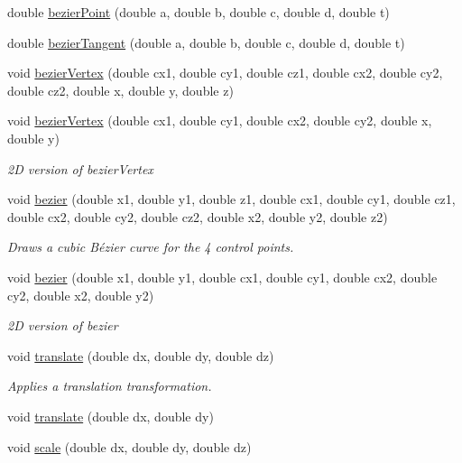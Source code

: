 \begin{DoxyCompactItemize}
\item 
double \hyperlink{namespacecprocessing_aaa32b0ef424d3452942ee2b0c9700a07}{bezier\-Point} (double a, double b, double c, double d, double t)
\item 
double \hyperlink{namespacecprocessing_abbb2d5344f97242bed221f93567c3bd9}{bezier\-Tangent} (double a, double b, double c, double d, double t)
\item 
void \hyperlink{namespacecprocessing_abefd6e82adec560aeb65511d5c04ec62}{bezier\-Vertex} (double cx1, double cy1, double cz1, double cx2, double cy2, double cz2, double x, double y, double z)
\item 
void \hyperlink{namespacecprocessing_a36c29d340db4d37f305d06d8408ef22d}{bezier\-Vertex} (double cx1, double cy1, double cx2, double cy2, double x, double y)
\begin{DoxyCompactList}\small\item\em 2\-D version of bezier\-Vertex \end{DoxyCompactList}\item 
void \hyperlink{namespacecprocessing_ab3bb61d1bd0741647c5f43163844e6a3}{bezier} (double x1, double y1, double z1, double cx1, double cy1, double cz1, double cx2, double cy2, double cz2, double x2, double y2, double z2)
\begin{DoxyCompactList}\small\item\em \-Draws a cubic \-Bézier curve for the 4 control points. \end{DoxyCompactList}\item 
void \hyperlink{namespacecprocessing_a5ec53e4626a728b9525286cd281b4796}{bezier} (double x1, double y1, double cx1, double cy1, double cx2, double cy2, double x2, double y2)
\begin{DoxyCompactList}\small\item\em 2\-D version of bezier \end{DoxyCompactList}\item 
void \hyperlink{namespacecprocessing_a0e437a343ef6fb18eb0212c24ddbf7b2}{translate} (double dx, double dy, double dz)
\begin{DoxyCompactList}\small\item\em \-Applies a translation transformation. \end{DoxyCompactList}\item 
void \hyperlink{namespacecprocessing_ae482816a2ac74376fface1261abbe47e}{translate} (double dx, double dy)
\item 
void \hyperlink{namespacecprocessing_a57d46ddaf4025cdf290f5ccb82725530}{scale} (double dx, double dy, double dz)

\end{DoxyCompactItemize}
